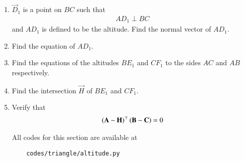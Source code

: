\begin{enumerate}[label=\thesubsection.\arabic*.,ref=\thesubsection.\theenumi]
\item $\vec{D}_1$ is a point on $BC$ such that
		\begin{align}
			AD_1 \perp BC
		\end{align}
		and $AD_1$ is defined to be the altitude. 
		Find the normal vector of $AD_1$.
  \\
		
	\item Find the equation of $AD_1$.
 \\     

	\item Find the equations of the altitudes $BE_1$ and $CF_1$ to the sides $AC$ and $AB$ respectively. 
  \\     
	\item Find the intersection $\vec{H}$ of $BE_1$ and $CF_1$.
 \\
        
	\item Verify that 
		\begin{align}
			\left(\mathbf{A}-\mathbf{H}\right)^{\top}\left(\mathbf{B}-\mathbf{C}\right) = 0
		\end{align}
  
All codes for this section are available at
\begin{lstlisting}
	codes/triangle/altitude.py
\end{lstlisting}
\end{enumerate}
